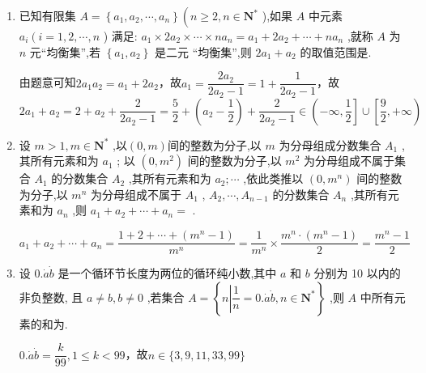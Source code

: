 \begin{enumerate}
\begin{jieda}
        故$b_n = T_n - T_{n-1} = \dfrac{2n+1}{2}(n \geq 2)$，即$a_n = 1  + \dfrac{1}{2n} (n \geq 2)$

        当$n = 1$时，$H_1 = \dfrac{1}{a_1} = \dfrac{2}{3}$，故$\dfrac{1}{a_1} = \dfrac{3}{2}$

        故$a_n = 1  + \dfrac{1}{2n}$
    \end{jieda}
    \item 已知有限集 $A = \left\{  {{a}_{1},{a}_{2},\cdots ,{a}_{n}}\right\}  \left( {n \geq  2,n \in  {\mathbf{N}}^{ * }}\right.$ ),如果 $A$ 中元素 ${a}_{i}\left( {i = 1,2,\cdots ,n}\right.$ ) 满足: ${a}_{1} \times  2{a}_{2} \times  \cdots  \times  n{a}_{n} = {a}_{1} + 2{a}_{2} + \cdots  + n{a}_{n}$ ,就称 $A$ 为 $n$ 元“均衡集”,若 $\left\{  {{a}_{1},{a}_{2}}\right\}$ 是二元 “均衡集”,则 $2{a}_{1} + {a}_{2}$ 的取值范围是\blkda[4]{$\left(-\infty, \dfrac{1}{2}\right] \cup \left[\dfrac{9}{2}, +\infty\right)$}.
    \begin{jieda}
        由题意可知$2a_1a_2 = a_1+2a_2$，故$a_1 = \dfrac{2a_2}{2a_2 - 1} = 1 + \dfrac{1}{2a_2-1}$，故$2{a}_{1} + {a}_{2} = 2+a_2 +\dfrac{2}{2a_2-1} = \dfrac{5}{2} + \left(a_2 - \dfrac{1}{2}\right) + \dfrac{2}{2a_2-1} \in \left(-\infty, \dfrac{1}{2}\right] \cup \left[\dfrac{9}{2}, +\infty\right)$
    \end{jieda}
    \item 设 $m > 1,m \in  {\mathbf{N}}^{ * }$ ,以$(0, m)$间的整数为分子,以 $m$ 为分母组成分数集合 ${A}_{1}$ ,其所有元素和为 ${a}_{1}$ ; 以 $\left( {0,{m}^{2}}\right)$ 间的整数为分子,以 ${m}^{2}$ 为分母组成不属于集合 ${A}_{1}$ 的分数集合 ${A}_{2}$ ,其所有元素和为 ${a}_{2};\cdots$ ,依此类推以 $\left( {0,{m}^{n}}\right)$ 间的整数为分子,以 ${m}^{n}$ 为分母组成不属于 ${A}_{1}$ , ${A}_{2},\cdots ,{A}_{n - 1}$ 的分数集合 ${A}_{n}$ ,其所有元素和为 ${a}_{n}$ ,则 ${a}_{1} + {a}_{2} + \cdots  + {a}_{n} =$ .
    \begin{jieda}
        ${a}_{1} + {a}_{2} + \cdots  + {a}_{n} = \dfrac{1+2+\cdots +(m^n-1)}{m^n} = \dfrac{1}{m^n} \times \dfrac{m^n \cdot (m^n-1)}{2} = \dfrac{m^n-1}{2}$
    \end{jieda}
    \item 设 $0.\dot{a}\dot{b}$ 是一个循环节长度为两位的循环纯小数,其中 $a$ 和 $b$ 分别为 10 以内的非负整数, 且 $a \neq  b,b \neq  0$ ,若集合 $A = \left\{  {n\left| {\dfrac{1}{n} = 0.\dot{a}\dot{b}}\right. ,n \in  {\mathbf{N}}^{ * }}\right\}$ ,则 $A$ 中所有元素的和为.
    \begin{jieda}
        $0.\dot{a}\dot{b} = \dfrac{k}{99}, 1 \leq k < 99$，故$n \in \{3,9,11,33,99\}$


\end{jieda}
\end{enumerate}
